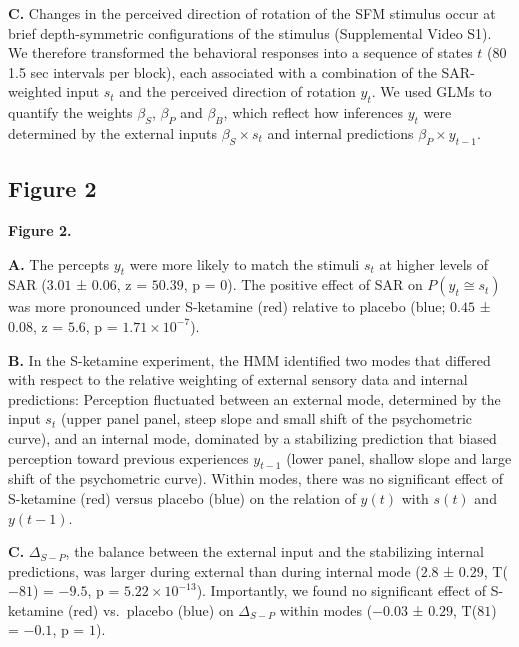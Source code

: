 \documentclass[
]{article}
\begin{document}
\textbf{C.} Changes in the perceived direction of rotation of the SFM
stimulus occur at brief depth-symmetric configurations of the stimulus
(Supplemental Video S1). We therefore transformed the behavioral
responses into a sequence of states \(t\) (80 1.5 sec intervals per
block), each associated with a combination of the SAR-weighted input
\(s_t\) and the perceived direction of rotation \(y_t\). We used GLMs to
quantify the weights \(\beta_S\), \(\beta_P\) and \(\beta_B\), which
reflect how inferences \(y_t\) were determined by the external inputs
\(\beta_S \times s_t\) and internal predictions
\(\beta_P \times y_{t-1}\).

\newpage

\hypertarget{figure-2}{%
\subsection{Figure 2}\label{figure-2}}


\textbf{Figure 2.}

\textbf{A.} The percepts \(y_t\) were more likely to match the stimuli
\(s_t\) at higher levels of SAR (\(3.01\) ± \(0.06\), z = \(50.39\), p =
\(0\)). The positive effect of SAR on \(P(y_t \cong s_t)\) was more
pronounced under S-ketamine (red) relative to placebo (blue; \(0.45\) ±
\(0.08\), z = \(5.6\), p = \(\ensuremath{1.71\times 10^{-7}}\)).

\textbf{B.} In the S-ketamine experiment, the HMM identified two modes
that differed with respect to the relative weighting of external sensory
data and internal predictions: Perception fluctuated between an external
mode, determined by the input \(s_t\) (upper panel panel, steep slope
and small shift of the psychometric curve), and an internal mode,
dominated by a stabilizing prediction that biased perception toward
previous experiences \(y_{t-1}\) (lower panel, shallow slope and large
shift of the psychometric curve). Within modes, there was no significant
effect of S-ketamine (red) versus placebo (blue) on the relation of
\(y(t)\) with \(s(t)\) and \(y(t-1)\).

\textbf{C.} \(\Delta_{S-P}\), the balance between the external input and
the stabilizing internal predictions, was larger during external than
during internal mode (\(2.8\) ± \(0.29\), T(\(-81\)) = \(-9.5\), p =
\(\ensuremath{5.22\times 10^{-13}}\)). Importantly, we found no
significant effect of S-ketamine (red) vs.~placebo (blue) on
\(\Delta_{S-P}\) within modes (\(-0.03\) ± \(0.29\), T(\(81\)) =
\(-0.1\), p = \(1\)).
\end{document}
